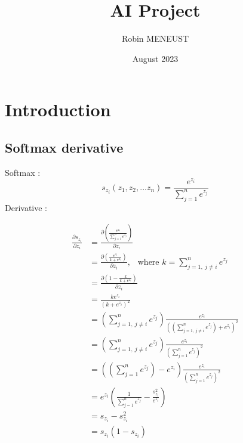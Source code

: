 \documentclass[11pt,a4paper]{report}
\title{
\textbf{\huge AI Project}\leavevmode \\
}
\author{\Large Robin MENEUST}
\date{\Large August 2023}
\begin{document}
\onehalfspacing
\begin{titlepage}
\hrulefill
\begin{center}
    \@title
\end{center}
\hrulefill
\vspace*{2cm}
\begin{center}
	\@author
\end{center}

\begin{center}
       \Large \@date
\end{center}   
\end{titlepage}
\makeatother


\tableofcontents

\newpage

\noindent

\section{Introduction}

\subsection{Softmax derivative}

Softmax :
\begin{equation}
    s_{z_i}(z_1, z_2, ... z_n) = \frac{e^{z_i}}{\sum\limits_{j=1}^{n} e^{z_j}}
\end{equation}
Derivative :

\begin{equation}
\begin{split}
    \frac{\partial s_{z_i}}{\partial z_i} &= \frac{\partial \left(\frac{e^{z_i}}{\sum\limits_{j=1}^{n} e^{z_j}}\right)}{\partial z_i}\\
    &= \frac{\partial \left(\frac{e^{z_i}}{k + e^{z_i}}\right)}{\partial z_i},\ \ \text{ where } k = \sum\limits_{j=1,\ j\neq i}^n e^{z_j}\\
    &= \frac{\partial\left( 1-\frac{k}{k+e^{z_i}}\right)}{\partial z_i}\\
    &= \frac{ke^{z_i}}{(k+e^{z_i})^2}\\
    &= \left(\sum\limits_{j=1,\ j\neq i}^{n} e^{z_j}\right)\frac{e^{z_i}}{\left(\left(\sum\limits_{j=1,\ j\neq i}^{n} e^{z_j}\right)+e^{z_i}\right)^2}\\
    &= \left(\sum\limits_{j=1,\ j\neq i}^{n} e^{z_j}\right)\frac{e^{z_i}}{\left(\sum\limits_{j=1}^{n} e^{z_j}\right)^2}\\
    &= \left(\left(\sum\limits_{j=1}^{n} e^{z_j}\right)-e^{z_i}\right)\frac{e^{z_i}}{\left(\sum\limits_{j=1}^{n} e^{z_j}\right)^2}\\
    &= e^{z_i}\left(\frac{1}{\sum\limits_{j=1}^{n} e^{z_j}} - 
    \frac{s_{z_i}^2}{e^{z_i}}\right)\\
    &= s_{z_i} - s_{z_i}^2\\
    &= s_{z_i} (1 - s_{z_i})\\
\end{split}
\end{equation}\\
\end{document}
